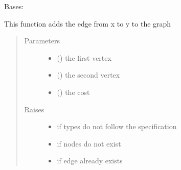 \documentclass[letterpaper,10pt,english]{sphinxmanual}
\begin{document}
\begin{fulllineitems}
\label{\detokenize{Graph:Graph.Graph}}
Bases: 

\begin{fulllineitems}
\label{\detokenize{Graph:Graph.Graph.add_edge}}
This function adds the edge from x to y to the graph
\begin{quote}\begin{description}
\item[{Parameters}] \leavevmode\begin{itemize}
\item {} 
 () \textendash{} the first vertex

\item {} 
 () \textendash{} the second vertex

\item {} 
 () \textendash{} the cost

\end{itemize}

\item[{Raises}] \leavevmode\begin{itemize}
\item {} 
 \textendash{} if types do not follow the specification

\item {} 
 \textendash{} if nodes do not exist

\item {} 
 \textendash{} if edge already exists

\end{itemize}

\end{description}\end{quote}


\end{fulllineitems}
\end{fulllineitems}
\end{document}
